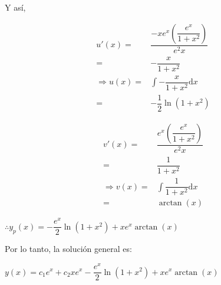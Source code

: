\documentclass{beamer}
\begin{document}
    \begin{frame}
        Y así, 

        \begin{minipage}[t]{0.45 \textwidth}
            \begin{align*}
                u'(x) =& \dfrac{-xe^x \left(\dfrac{e^x}{1 + x^2} \right)}{e^2x} \\
                =& -\dfrac{x}{1 + x^2} \\
                \Longrightarrow u(x) =& \int -\dfrac{x}{1 + x^2} \mathrm{d}x \\
                =& -\dfrac{1}{2} \ln (1 + x^2)
            \end{align*}
        \end{minipage} \begin{minipage}[t]{0.45 \textwidth}
            \begin{align*}
                v'(x) =& \dfrac{e^x \left(\dfrac{e^x}{1 + x^2} \right)}{e^2x} \\
                =& \dfrac{1}{1 + x^2} \\
                \Longrightarrow v(x) =& \int \dfrac{1}{1 + x^2} \mathrm{d}x \\
                =& \arctan (x)
            \end{align*}
        \end{minipage}
        $ \therefore y_p(x) = -\dfrac{e^x}{2} \ln (1 + x^2) + xe^x \arctan(x) $
    \end{frame}
    \begin{frame}
        Por lo tanto, la solución general es:

        $ y(x) = c_1e^x + c_2xe^x -\dfrac{e^x}{2} \ln (1 + x^2) + xe^x \arctan(x) $
    \end{frame}
\end{document}
